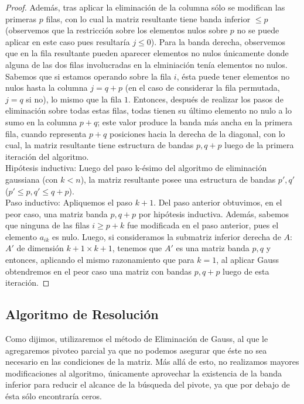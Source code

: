 \begin{proof}
 Además, tras aplicar la eliminación de la columna sólo se modifican las primeras $p$ filas, con lo cual la matriz resultante tiene banda inferior $\leq p$ (observemos que la restricción sobre los elementos nulos sobre $p$ no se puede aplicar en este caso pues resultaría $j\leq 0$).   Para la banda derecha, observemos que en la fila resultante pueden aparecer elementos no nulos únicamente donde alguna de las dos filas involucradas en la elminiación tenía elementos no nulos. Sabemos que si estamos operando sobre la fila $i$, ésta puede tener elementos no nulos hasta la columna $j = q+p$ (en el caso de considerar la fila permutada, $j = q$ si no), lo mismo que la fila $1$. Entonces, después de realizar los pasos de eliminación sobre todas estas filas, todas tienen su último elemento no nulo a lo sumo en la columna $p+q$; este valor produce la banda más ancha en la primera fila, cuando representa $p+q$ posiciones hacia la derecha de la diagonal, con lo cual, la matriz resultante tiene estructura de bandas $p, q+p$ luego de la primera iteración del algoritmo.\\

Hipótesis inductiva: Luego del paso k-ésimo del algoritmo de eliminación gaussiana (con $k < n$), la matriz resultante posee una estructura de bandas $p', q'$ ($p' \leq p, q' \leq q+p$).\\

Paso inductivo: Apliquemos el paso $k+1$. Del paso anterior obtuvimos, en el peor caso, una matriz banda $p, q+p$ por hipótesis inductiva. Además, sabemos que ninguna de las filas $i \geq p+k$ fue modificada en el paso anterior, pues el elemento $a_{ik}$ es nulo. Luego, si consideramos la submatriz inferior derecha de $A$: $A'$ de dimensión $k+1 \times k+1$, tenemos que $A'$ es una matriz banda $p, q$ y entonces, aplicando el mismo razonamiento que para $k=1$, al aplicar Gauss obtendremos en el peor caso una matriz con bandas $p, q+p$ luego de esta iteración.
\end{proof}

\subsection{Algoritmo de Resolución}
Como dijimos, utilizaremos el método de Eliminación de Gauss, al que le agregaremos pivoteo parcial  ya que no podemos asegurar que éste no sea necesario en las condiciones de la matriz. Más allá de esto, no realizamos mayores modificaciones al algoritmo, únicamente aprovechar la existencia de la banda inferior para reducir el alcance de la búsqueda del pivote, ya que por debajo de ésta sólo encontraría ceros.




